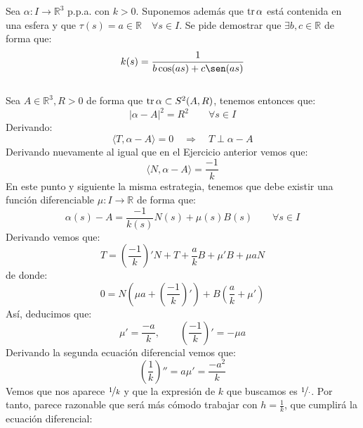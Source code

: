 \begin{ejercicio}
    Sea $\alpha:I\to\mathbb{R}^3$ p.p.a. con $k>0$. Suponemos además que $\operatorname{tr}\alpha$ está contenida en una esfera y que $\tau(s) = a \in \mathbb{R}\quad \forall s\in I$. Se pide demostrar que $\exists b,c\in \mathbb{R}$ de forma que:
    \begin{equation*}
        k(s) = \frac{1}{b\cos(as) + c\sen(as)}
    \end{equation*}~\\

    \noindent
    Sea $A\in \mathbb{R}^3,R>0$ de forma que $\operatorname{tr}\alpha\subset S^2(A,R)$, tenemos entonces que:
    \begin{equation*}
        |\alpha-A|^2 = R^2 \qquad \forall s\in I
    \end{equation*}
    Derivando:
    \begin{equation*}
        \langle T,\alpha-A \rangle = 0 \quad\Longrightarrow\quad T\perp \alpha-A
    \end{equation*}
    Derivando nuevamente al igual que en el Ejercicio anterior vemos que:
    \begin{equation*}
        \langle N,\alpha-A \rangle = \frac{-1}{k}
    \end{equation*}
    En este punto y siguiente la misma estrategia, tenemos que debe existir una función diferenciable $\mu:I\to\mathbb{R}$ de forma que:
    \begin{equation*}
        \alpha(s)-A = \frac{-1}{k(s)}N(s) + \mu(s)B(s) \qquad \forall s\in I
    \end{equation*}
    Derivando vemos que:
    \begin{equation*}
        T = \left(\frac{-1}{k}\right)'N + T + \frac{a}{k}B + \mu'B + \mu aN
    \end{equation*}
    de donde:
    \begin{equation*}
        0 = N\left(\mu a + \left(\frac{-1}{k}\right)'\right) + B\left(\frac{a}{k}+\mu'\right)
    \end{equation*}
    Así, deducimos que:
    \begin{equation*}
        \mu' = \frac{-a}{k}, \qquad \left(\frac{-1}{k}\right)' = -\mu a
    \end{equation*}
    Derivando la segunda ecuación diferencial vemos que:
    \begin{equation*}
        \left(\frac{1}{k}\right)'' = a\mu' = \frac{-a^2}{k}
    \end{equation*}
    Vemos que nos aparece $\nicefrac{1}{k}$ y que la expresión de $k$ que buscamos es $\nicefrac{1}{\cdot }$. Por tanto, parece razonable que será más cómodo trabajar con $h = \frac{1}{k}$, que cumplirá la ecuación diferencial:

\end{ejercicio}
